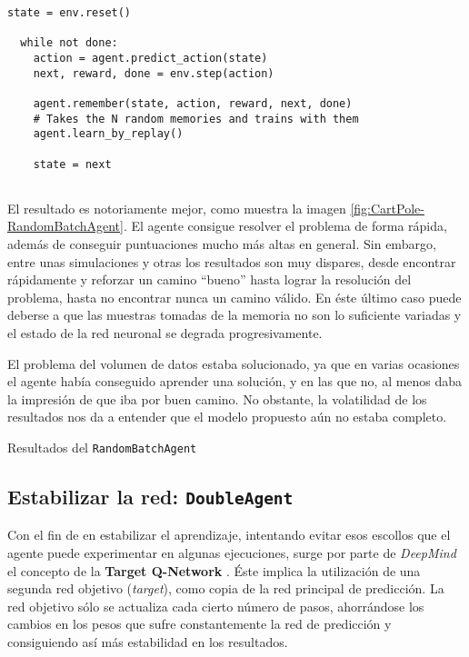 \begin{minipage}{0.9\linewidth}%
\begin{lstlisting}[frame=tb, caption=Pseudocódigo RandomBatchAgent, inputencoding=latin1, label=code:cartpole_drl3]
  state = env.reset()

  while not done:
    action = agent.predict_action(state)
    next, reward, done = env.step(action)

    agent.remember(state, action, reward, next, done)
    # Takes the N random memories and trains with them
    agent.learn_by_replay()

    state = next
              
\end{lstlisting}%
\end{minipage}

El resultado es notoriamente mejor, como muestra la imagen \ref{fig:CartPole-RandomBatchAgent}. El agente consigue resolver el problema de forma rápida, además de conseguir puntuaciones mucho más altas en general. Sin embargo, entre unas simulaciones y otras los resultados son muy dispares, desde encontrar rápidamente y reforzar un camino ``bueno'' hasta lograr la resolución del problema, hasta no encontrar nunca un camino válido. En éste último caso puede deberse a que las muestras tomadas de la memoria no son lo suficiente variadas y el estado de la red neuronal se degrada progresivamente.

El problema del volumen de datos estaba solucionado, ya que en varias ocasiones el agente había conseguido aprender una solución, y en las que no, al menos daba la impresión de que iba por buen camino. No obstante, la volatilidad de los resultados nos da a entender que el modelo propuesto aún no estaba completo.

%
       {Resultados del \texttt{RandomBatchAgent}}


\subsection{Estabilizar la red: \texttt{DoubleAgent}}
\label{sec:DA}

Con el fin de en estabilizar el aprendizaje, intentando evitar esos escollos que el agente puede experimentar en algunas ejecuciones, surge por parte de \textit{DeepMind} el concepto de la \textbf{Target Q-Network} \citep{NIPS2010_3964}. Éste implica la utilización de una segunda red objetivo (\textit{target}), como copia de la red principal de predicción. La red objetivo sólo se actualiza cada cierto número de pasos, ahorrándose los cambios en los pesos que sufre constantemente la red de predicción y consiguiendo así más estabilidad en los resultados.

